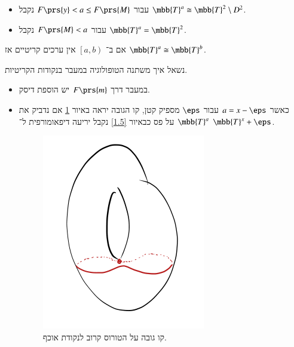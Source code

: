 \documentclass[a4paper,10pt,twoside,openany]{book}
\begin{document}
\begin{example}
\begin{itemize}
\item
עבור
$F\prs{y} < a \leq F\prs{M}$
נקבל
$\mbb{T}^a \cong \mbb{T}^2 \setminus D^2$.
\item עבור
$F\prs{M} < a$
נקבל
$\mbb{T}^a = \mbb{T}^2$.
\end{itemize}

\begin{corollary}
אם ב־%
$\left[ a, b \right)$
אין ערכים קריטיים אז
$\mbb{T}^a \cong \mbb{T}^b$.
\end{corollary}

נשאל איך משתנה הטופולוגיה במעבר בנקודות הקריטיות.
\begin{itemize}
\item במעבר דרך
$F\prs{m}$
יש הוספת דיסק.
\item כאשר
$a = x-\eps$
עבור
$\eps$
מספיק קטן, קו הגובה יראה באיור
\ref{1.4}
אם נדביק את
$\mbb{T}^a$
על פס כבאיור
\ref{1.5}
נקבל יריעה דיפאומורפית ל־%
$\mbb{T}^x+\eps$.

\begin{figure}
\centering
\includegraphics[scale=0.5]{sources/1.4}
\caption{קו גובה על הטורוס קרוב לנקודת אוכף.}
\label{1.4}
\end{figure}


\end{itemize}
\end{example}
\end{document}
